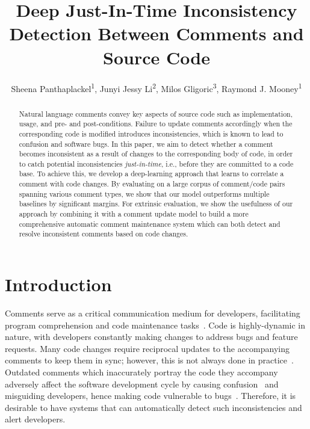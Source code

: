 \documentclass[letterpaper]{article} %
\title{Deep Just-In-Time Inconsistency Detection Between Comments and Source Code}
\author{
Sheena Panthaplackel\textsuperscript{\rm 1},
Junyi Jessy Li\textsuperscript{\rm 2},
Milos Gligoric\textsuperscript{\rm 3},
Raymond J. Mooney\textsuperscript{\rm 1}\\
}
\begin{document}
\maketitle


\begin{abstract}
Natural language comments convey key aspects of source code such as implementation, usage, and pre- and post-conditions. Failure to update comments accordingly when the corresponding code is modified introduces inconsistencies, which is known to lead to confusion and software bugs. In this paper, we aim to detect whether a comment becomes inconsistent as a result of changes to the corresponding body of code, in order to catch potential inconsistencies \emph{just-in-time}, i.e., before they are committed to a code base. To achieve this, we develop a deep-learning approach that learns to correlate a comment with code changes. By evaluating on a large corpus of comment/code pairs spanning various comment types, we show that our model outperforms multiple baselines by significant margins. For extrinsic evaluation, we show the usefulness of our approach by combining it with a comment update model to build a more comprehensive automatic comment maintenance system which can both detect and resolve inconsistent comments based on code changes.
\end{abstract}



\section{Introduction}
Comments serve as a critical communication medium for developers, facilitating program comprehension and code maintenance tasks~\cite{CodeReadabilityBuse,deSouzaMaintenance}. Code is highly-dynamic in nature, with developers constantly making changes to address bugs and feature requests. Many code changes require reciprocal updates to the accompanying comments to keep them in sync; however, this is not always done in practice~\cite{WenLargeStudy, FluriAnalysis,ratol2017fragile, JiangEvolution, ZhouParameter,icomment2007}. Outdated comments which inaccurately portray the code they accompany adversely affect the software development cycle by causing confusion~\cite{WenLargeStudy, JiangEvolution, icomment2007, ZhouParameter} and misguiding developers, hence making code vulnerable to bugs~\cite{JiangEvolution, icomment2007,IbrahimBugs}. Therefore, it is desirable to have systems that can automatically detect such inconsistencies and alert developers.
\end{document}
